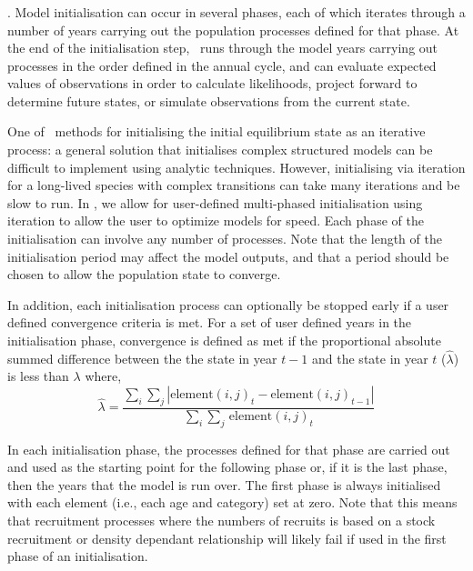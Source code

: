 \subsubsection{}

. Model initialisation can occur in several phases, each of which iterates through a number of years carrying out the population processes defined for that phase. At the end of the initialisation step, \CAS\ runs through the model years carrying out processes in the order defined in the annual cycle, and can evaluate expected values of observations in order to calculate likelihoods, project forward to determine future states, or simulate observations from the current state.

One of \CAS\ methods for initialising the initial equilibrium state as an iterative process: a general solution that initialises complex structured models can be difficult to implement using analytic techniques. However, initialising via iteration for a long-lived species with complex transitions can take many iterations and be slow to run. In \CAS, we allow for user-defined multi-phased initialisation using iteration to allow the user to optimize models for speed. Each phase of the initialisation can involve any number of processes. Note that the length of the initialisation period may affect the model outputs, and that a period should be chosen to allow the population state to converge.

In addition, each initialisation process can optionally be stopped early if a user defined convergence criteria is met. For a set of user defined years in the initialisation phase, convergence is defined as met if the proportional absolute summed difference between the the state in year $t-1$ and the state in year $t$ ($\widehat{\lambda}$) is less than $\lambda$ where, 
\begin{equation}
  \widehat{\lambda} = \frac{\sum\limits_{i} \sum\limits_{j} \left|\text{element}(i,j)_t - \text{element}(i,j)_{t-1} \right|}{\sum\limits_{i} \sum\limits_{j} \frac{}{}\text{element}(i,j)_t}
\end{equation}

In each initialisation phase, the processes defined for that phase are carried out and used as the starting point for the following phase or, if it is the last phase, then the years that the model is run over. The first phase is always initialised with each element (i.e., each age and category) set at zero. Note that this means that recruitment processes where the numbers of recruits is based on a stock recruitment or density dependant relationship will likely fail if used in the first phase of an initialisation. 

